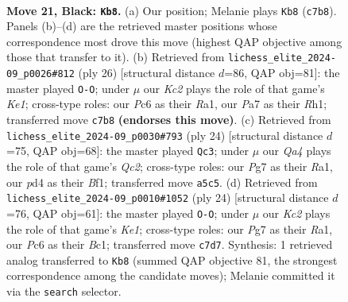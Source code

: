 \documentclass[11pt]{article}
\begin{document}
\clearpage

\begin{figure}[p]\centering
\begin{subfigure}{0.46\textwidth}\centering
\resizebox{\linewidth}{!}{%
\newchessgame
\chessboard[
  setfen={r4b1r/ppk3pp/2p1b3/q2p1p2/P2P3P/1Q2PN2/1PK2PP1/1RB4R b - - 0 21},
  showmover=false,
  pgfstyle=straightmove, color=movearrow, markmove={c7-b8}
]}
\caption{}
\end{subfigure}\hfill
\begin{subfigure}{0.46\textwidth}\centering
\resizebox{\linewidth}{!}{%
\newchessgame
\chessboard[
  setfen={r1b2rk1/p4ppp/1pn1p3/q2p2P1/3P1B2/P1P5/2PQ1PBP/R3K2R w KQ - 0 14},
  showmover=false,
  pgfstyle=straightmove, color=movearrow, markmove={e1-g1}
]}
\caption{}
\end{subfigure}
\\[4pt]
\begin{subfigure}{0.46\textwidth}\centering
\resizebox{\linewidth}{!}{%
\newchessgame
\chessboard[
  setfen={r1b2r2/ppp2pk1/2n3p1/q3p2p/4P2P/PP3N2/2QP1PP1/R3KB1R w KQ - 0 13},
  showmover=false,
  pgfstyle=straightmove, color=movearrow, markmove={c2-c3}
]}
\caption{}
\end{subfigure}\hfill
\begin{subfigure}{0.46\textwidth}\centering
\resizebox{\linewidth}{!}{%
\newchessgame
\chessboard[
  setfen={r1b2rk1/pppn1pp1/7p/3p2q1/3P4/2PBP3/P1Q2PP1/R1B1K2R w KQ - 0 13},
  showmover=false,
  pgfstyle=straightmove, color=movearrow, markmove={e1-g1}
]}
\caption{}
\end{subfigure}
\caption{\textbf{Move 21, Black: \texttt{Kb8}.} (a) Our position; Melanie plays \texttt{Kb8} (\texttt{c7b8}). Panels (b)--(d) are the retrieved master positions whose correspondence most drove this move (highest QAP objective among those that transfer to it). (b) Retrieved from \texttt{lichess\_elite\_2024-09\_p0026\#812} (ply 26) [structural distance $d$=86, QAP obj=81]: the master played \texttt{O-O}; under $\mu$ our \emph{Kc2} plays the role of that game's \emph{Ke1}; cross-type roles: our \emph{P}c6 as their \emph{R}a1, our \emph{P}a7 as their \emph{R}h1; transferred move \texttt{c7b8} \textbf{(endorses this move)}. (c) Retrieved from \texttt{lichess\_elite\_2024-09\_p0030\#793} (ply 24) [structural distance $d$=75, QAP obj=68]: the master played \texttt{Qc3}; under $\mu$ our \emph{Qa4} plays the role of that game's \emph{Qc2}; cross-type roles: our \emph{P}g7 as their \emph{R}a1, our \emph{p}d4 as their \emph{B}f1; transferred move \texttt{a5c5}. (d) Retrieved from \texttt{lichess\_elite\_2024-09\_p0010\#1052} (ply 24) [structural distance $d$=76, QAP obj=61]: the master played \texttt{O-O}; under $\mu$ our \emph{Kc2} plays the role of that game's \emph{Ke1}; cross-type roles: our \emph{P}g7 as their \emph{R}a1, our \emph{P}c6 as their \emph{B}c1; transferred move \texttt{c7d7}. Synthesis: 1 retrieved analog transferred to \texttt{Kb8} (summed QAP objective 81, the strongest correspondence among the candidate moves); Melanie committed it via the \texttt{search} selector.}
\label{fig:thought-m41}
\end{figure}
\end{document}
